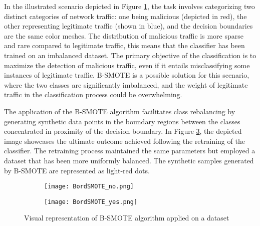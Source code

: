 In the illustrated scenario depicted in Figure \ref{fig:bordSMOTEnotApplied}, the task involves categorizing two distinct categories of network traffic: 
one being malicious (depicted in red), the other representing legitimate traffic (shown in blue), and the decision boundaries are the same color meshes.
The distribution of malicious traffic is more sparse and rare compared to legitimate traffic, this means that the classifier has been trained on an imbalanced dataset. 
The primary objective of the classification is to maximize the detection of malicious traffic, even if it entails misclassifying some instances of legitimate traffic. 
B-SMOTE is a possible solution for this scenario, where the two classes are significantly imbalanced, and the weight of legitimate traffic in the classification process could be overwhelming.

The application of the B-SMOTE algorithm facilitates class rebalancing by generating synthetic data points in the boundary regions between the classes concentrated in proximity of the decision boundary.
In Figure \ref{fig:bordSMOTEApplied}, the depicted image showcases the ultimate outcome achieved following the retraining of the classifier. 
The retraining process maintained the same parameters but employed a dataset that has been more uniformly balanced.
The synthetic samples generated by B-SMOTE are represented as light-red dots.
\begin{figure}[H]
  \centering
  \begin{subfigure}{0.49\linewidth}
    \texttt{[image: BordSMOTE\_no.png]}
    \caption{}
    \label{fig:bordSMOTEnotApplied}
  \end{subfigure}
  \begin{subfigure}{0.49\linewidth}
    \texttt{[image: BordSMOTE\_yes.png]}
    \caption{}
    \label{fig:bordSMOTEApplied}
  \end{subfigure}
  \caption{Visual representation of B-SMOTE algorithm applied on a dataset}
\end{figure}

